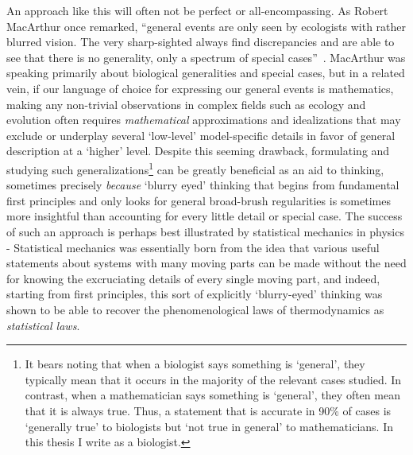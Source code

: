 An approach like this will often not be perfect or all-encompassing. As Robert MacArthur once remarked, ``general events are only seen by ecologists with rather blurred vision. The very sharp-sighted always find discrepancies and are able to see that there is no generality, only a spectrum of special cases”~\citep{kingsland_modeling_1985}. MacArthur was speaking primarily about biological generalities and special cases, but in a related vein, if our language of choice for expressing our general events is mathematics, making any non-trivial observations in complex fields such as ecology and evolution often requires \emph{mathematical} approximations and idealizations that may exclude or underplay several `low-level' model-specific details in favor of general description at a `higher' level. Despite this seeming drawback, formulating and studying such generalizations\footnote{It bears noting that when a biologist says something is `general', they typically mean that it occurs in the majority of the relevant cases studied. In contrast, when a mathematician says something is `general', they often mean that it is always true. Thus, a statement that is accurate in 90\% of cases is `generally true' to biologists but `not true in general' to mathematicians. In this thesis I write as a biologist.} can be greatly beneficial as an aid to thinking, sometimes precisely \emph{because} `blurry eyed' thinking that begins from fundamental first principles and only looks for general broad-brush regularities is sometimes more insightful than accounting for every little detail or special case. The success of such an approach is perhaps best illustrated by statistical mechanics in physics - Statistical mechanics was essentially born from the idea that various useful statements about systems with many moving parts can be made without the need for knowing the excruciating details of every single moving part, and indeed, starting from first principles, this sort of explicitly `blurry-eyed' thinking was shown to be able to recover the phenomenological laws of thermodynamics as \emph{statistical laws}.

